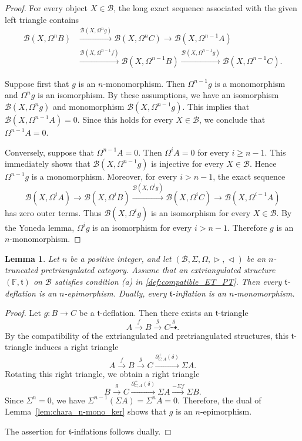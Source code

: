 \documentclass[a4paper,reqno,10pt]{amsart}
\newtheorem{lemma}[lemma]{Lemma}
\theoremstyle{definition}
\theoremstyle{definition}
\theoremstyle{definition}
\theoremstyle{definition}
\theoremstyle{plain}
\newcommand{\ft}{\mathfrak{t}}
\newcommand{\BF}{\mathbb{F}}
\newcommand{\CB}{\mathcal{B}}
\begin{document}
\begin{proof}
For every object $X\in\CB$, the long exact sequence associated with
the given left triangle contains
$$
\begin{aligned}
\CB(X,\Omega^n B)
&\xrightarrow{\CB(X,\Omega^n g)}
\CB(X,\Omega^n C)
\longrightarrow
\CB(X,\Omega^{n-1}A)\\
&\xrightarrow{\CB(X,\Omega^{n-1}f)}
\CB(X,\Omega^{n-1}B)
\xrightarrow{\CB(X,\Omega^{n-1}g)}
\CB(X,\Omega^{n-1}C).
\end{aligned}
$$

Suppose first that $g$ is an $n$-monomorphism. Then
$\Omega^{n-1}g$ is a monomorphism and $\Omega^n g$ is an
isomorphism. By these assumptions, we have an isomorphism $\CB(X,\Omega^n g)$ and monomorphism $\CB(X,\Omega^{n-1}g)$. This implies that $\CB(X,\Omega^{n-1}A)=0$. 
Since this holds for every $X\in\CB$, we conclude that $\Omega^{n-1}A=0$.

Conversely, suppose that $\Omega^{n-1}A=0$. Then
$\Omega^i A=0$ for every $i\geq n-1$. This immediately shows that
$\CB(X,\Omega^{n-1}g)$ is injective for every $X\in\CB$. Hence $\Omega^{n-1}g$ is a monomorphism. Moreover, for every $i> n-1$, the exact sequence
$$
\CB(X,\Omega^i A)
\longrightarrow
\CB(X,\Omega^i B)
\xrightarrow{\CB(X,\Omega^i g)}
\CB(X,\Omega^i C)
\longrightarrow
\CB(X,\Omega^{i-1}A)
$$
has zero outer terms. Thus $\CB(X,\Omega^i g)$ is an isomorphism
for every $X\in\CB$. By the Yoneda lemma, $\Omega^i g$ is an
isomorphism for every $i>n-1$. Therefore $g$ is an
$n$-monomorphism.
\end{proof}

\begin{lemma}
\label{lem:defl_are_n-epi}
Let $n$ be a positive integer, and let $(\CB,\Sigma,\Omega,\vartriangleright,\vartriangleleft)$ be an $n$-truncated pretriangulated category.
Assume that an extriangulated structure $(\BF,\ft)$ on $\CB$ 
\color{blue}
satisfies condition {\rm (a)} in \cref{def:compatible_ET_PT}.
\normalcolor
Then every $\ft$-deflation is an
$n$-epimorphism. Dually, every $\ft$-inflation is an
$n$-monomorphism.
\end{lemma}

\begin{proof}
Let $g\colon B\to C$ be a $\ft$-deflation. Then there exists an
$\ft$-triangle
$$
A\xrightarrow{f}B\xrightarrow{g}C
\overset{\delta}{\dashrightarrow}.
$$
By the compatibility of the extriangulated and pretriangulated
structures, this $\ft$-triangle induces a right triangle
$$
A\xrightarrow{f}B\xrightarrow{g}C
\xrightarrow{\partial^+_{C,A}(\delta)}\Sigma A.
$$
Rotating this right triangle, we obtain a right triangle
$$
B\xrightarrow{g}C
\xrightarrow{\partial^+_{C,A}(\delta)}
\Sigma A\xrightarrow{-\Sigma f}\Sigma B.
$$
Since $\Sigma^n=0$, we have $\Sigma^{n-1}(\Sigma A)=\Sigma^n A=0$. 
Therefore, the dual of Lemma~\ref{lem:chara_n-mono_ker} shows that
$g$ is an $n$-epimorphism. 

The assertion for $\ft$-inflations follows dually.
\end{proof}
\end{document}
